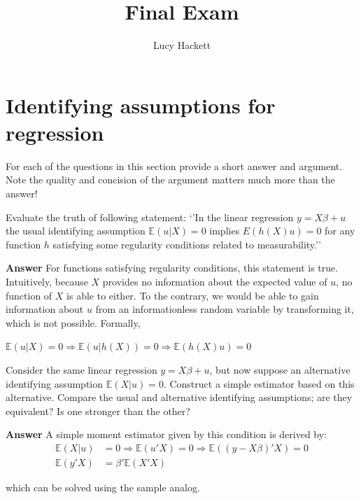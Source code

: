\documentclass[11pt]{exam}
\title{Final Exam}
\author{Lucy Hackett}
\begin{document}
    
    \maketitle
    
    

    
    \hypertarget{identifying-assumptions-for-regression}{%
\section{Identifying assumptions for
regression}\label{identifying-assumptions-for-regression}}

For each of the questions in this section provide a short answer and
argument. Note the quality and concision of the argument matters much
more than the answer!

\begin{questions}
    \question Evaluate the truth of following statement: `'In the linear
regression \(y = X\beta + u\) the usual identifying assumption
\(\mathbb{E}(u|X) = 0\) implies \(E(h(X)u) = 0\) for any function \(h\)
satisfying some regularity conditions related to measurability.''

\textbf{Answer} For functions satisfying regularity conditions, this
statement is true. Intuitively, because \(X\) provides no information about the expected value of \(u\), no function of \(X\) is able to either. To the contrary, we would be able to gain information about $u$ from an informationless random variable by transforming it, which is not possible.
Formally,

\(\mathbb{E}(u|X) = 0 \Rightarrow \mathbb{E}(u|h(X)) = 0 \Rightarrow \mathbb{E}(h(X)u) = 0\)

\question Consider the same linear regression \(y = X\beta + u\), but
now suppose an alternative identifying assumption
\(\mathbb{E}(X|u) = 0\). Construct a simple estimator based on this
alternative. Compare the usual and alternative identifying assumptions;
are they equivalent? Is one stronger than the other?

\textbf{Answer} A simple moment estimator given by this condition is
derived by:
\begin{align*} \mathbb{E}(X|u) &= 0 \Rightarrow \mathbb{E}(u'X) = 0 \Rightarrow \mathbb{E}((y - X\beta)'X) = 0 \\ \mathbb{E}(y'X) &= \beta'\mathbb{E}(X'X) \end{align*}

which can be solved using the sample analog.


\end{questions}
\end{document}
